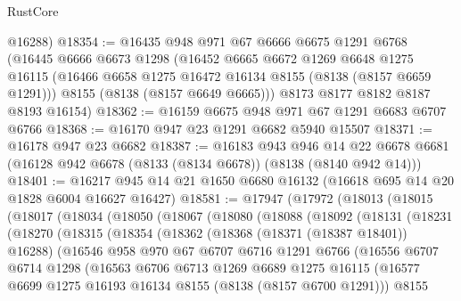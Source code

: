 \begin{lexlean}{RustCore}
\begin{coremodule}
      @16288)
@18354 := @16435
    @948
    @971
    @67
    @6666
    @6675
    @1291
    @6768
    (@16445
      @6666
      @6673
      @1298
      (@16452
        @6665
        @6672
        @1269
        @6648
        @1275
        @16115
        (@16466 @6658 @1275 @16472 @16134 @8155 (@8138 (@8157 @6659 @1291)))
        @8155
        (@8138 (@8157 @6649 @6665)))
      @8173
      @8177
      @8182
      @8187
      @8193
      @16154)
@18362 := @16159 @6675 @948 @971 @67 @1291 @6683 @6707 @6766
@18368 := @16170 @947 @23 @1291 @6682 @5940 @15507
@18371 := @16178 @947 @23 @6682
@18387 := @16183
    @943
    @946
    @14
    @22
    @6678
    @6681
    (@16128 @942 @6678 (@8133 (@8134 @6678)) (@8138 (@8140 @942 @14)))
@18401 := @16217 @945 @14 @21 @1650 @6680 @16132 (@16618 @695 @14 @20 @1828 @6004 @16627 @16427)
@18581 := @17947
    (@17972
      (@18013
        (@18015
          (@18017
            (@18034
              (@18050
                (@18067
                  (@18080
                    (@18088
                      (@18092
                        (@18131
                          (@18231
                            (@18270
                              (@18315
                                (@18354
                                  (@18362
                                    (@18368 (@18371 (@18387 @18401)) @16288)
                                    (@16546
                                      @958
                                      @970
                                      @67
                                      @6707
                                      @6716
                                      @1291
                                      @6766
                                      (@16556
                                        @6707
                                        @6714
                                        @1298
                                        (@16563
                                          @6706
                                          @6713
                                          @1269
                                          @6689
                                          @1275
                                          @16115
                                          (@16577
                                            @6699
                                            @1275
                                            @16193
                                            @16134
                                            @8155
                                            (@8138 (@8157 @6700 @1291)))
                                          @8155

\end{coremodule}
\end{lexlean}
